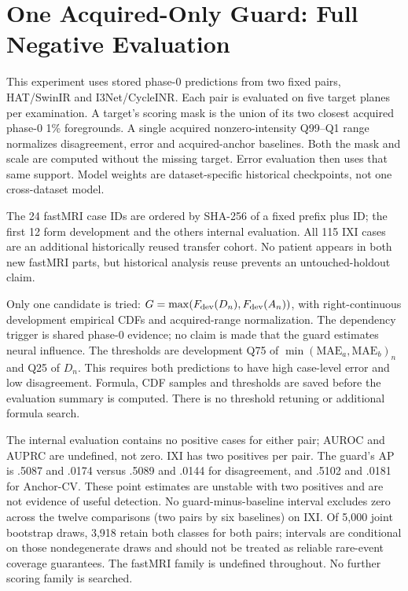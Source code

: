\section{One Acquired-Only Guard: Full Negative Evaluation}
This experiment uses stored phase-0 predictions from two fixed pairs, HAT/SwinIR and I3Net/CycleINR. Each pair is evaluated on five target planes per examination. A target's scoring mask is the union of its two closest acquired phase-0 1\% foregrounds. A single acquired nonzero-intensity Q99--Q1 range normalizes disagreement, error and acquired-anchor baselines. Both the mask and scale are computed without the missing target. Error evaluation then uses that same support. Model weights are dataset-specific historical checkpoints, not one cross-dataset model.

The 24 fastMRI case IDs are ordered by SHA-256 of a fixed prefix plus ID; the first 12 form development and the others internal evaluation. All 115 IXI cases are an additional historically reused transfer cohort. No patient appears in both new fastMRI parts, but historical analysis reuse prevents an untouched-holdout claim.

Only one candidate is tried: $G=\max(F_{\rm dev}(D_n),F_{\rm dev}(A_n))$, with right-continuous development empirical CDFs and acquired-range normalization. The dependency trigger is shared phase-0 evidence; no claim is made that the guard estimates neural influence. The thresholds are development Q75 of $\min(\mathrm{MAE}_a,\mathrm{MAE}_b)_n$ and Q25 of $D_n$. This requires both predictions to have high case-level error and low disagreement. Formula, CDF samples and thresholds are saved before the evaluation summary is computed. There is no threshold retuning or additional formula search.



The internal evaluation contains no positive cases for either pair; AUROC and AUPRC are undefined, not zero. IXI has two positives per pair. The guard's AP is .5087 and .0174 versus .5089 and .0144 for disagreement, and .5102 and .0181 for Anchor-CV. These point estimates are unstable with two positives and are not evidence of useful detection. No guard-minus-baseline interval excludes zero across the twelve comparisons (two pairs by six baselines) on IXI. Of 5,000 joint bootstrap draws, 3,918 retain both classes for both pairs; intervals are conditional on those nondegenerate draws and should not be treated as reliable rare-event coverage guarantees. The fastMRI family is undefined throughout. No further scoring family is searched.

